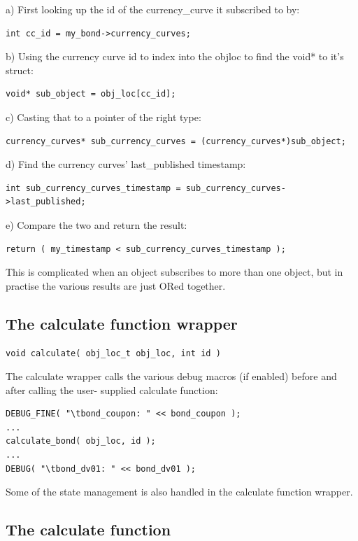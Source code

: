 \documentclass{report}
\begin{document}
a) First looking up the id of the currency_curve it subscribed to by:
\begin{verbatim}
int cc_id = my_bond->currency_curves;
\end{verbatim}

b) Using the currency curve id to index into the objloc to find the void* to it's struct:
\begin{verbatim}
void* sub_object = obj_loc[cc_id];
\end{verbatim}

c) Casting that to a pointer of the right type:
\begin{verbatim}
currency_curves* sub_currency_curves = (currency_curves*)sub_object;
\end{verbatim}

d) Find the currency curves' last_published timestamp:
    
\begin{verbatim}
int sub_currency_curves_timestamp = sub_currency_curves->last_published;
\end{verbatim}

e) Compare the two and return the result:
\begin{verbatim}
return ( my_timestamp < sub_currency_curves_timestamp );
\end{verbatim}

This is complicated when an object subscribes to more than one object, but in practise the various results are just ORed together. 

\subsection{The calculate function wrapper}

\begin{verbatim}
void calculate( obj_loc_t obj_loc, int id )
\end{verbatim}

The calculate wrapper calls the various debug macros (if enabled) before and after calling the user-
supplied calculate function:

\begin{verbatim}
DEBUG_FINE( "\tbond_coupon: " << bond_coupon );
...
calculate_bond( obj_loc, id );
...
DEBUG( "\tbond_dv01: " << bond_dv01 );
\end{verbatim}

Some of the state management is also handled in the calculate function wrapper.

\subsection{The calculate function}
\end{document}
